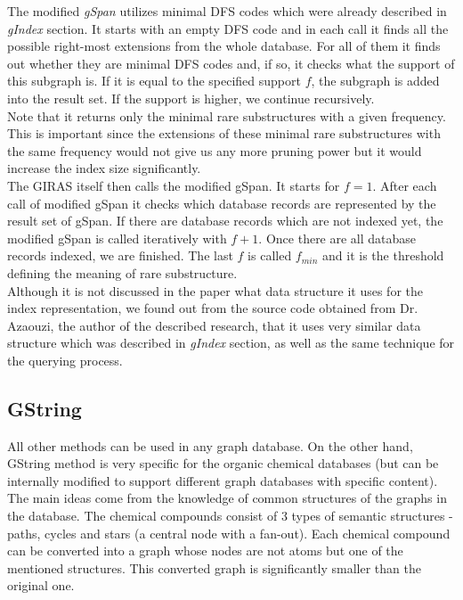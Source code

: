 The modified \textit{gSpan} utilizes minimal DFS codes which were already described in \textit{gIndex} section. It starts with an empty DFS code and in each call it finds all the possible right-most extensions from the whole database. For all of them it finds out whether they are minimal DFS codes and, if so, it checks what the support of this subgraph is. If it is equal to the specified support $f$, the subgraph is added into the result set. If the support is higher, we continue recursively.\\

Note that it returns only the minimal rare substructures with a given frequency. This is important since the extensions of these minimal rare substructures with the same frequency would not give us any more pruning power but it would increase the index size significantly.\\

The GIRAS itself then calls the modified gSpan. It starts for $f=1$. After each call of modified gSpan it checks which database records are represented by the result set of gSpan. If there are database records which are not indexed yet, the modified gSpan is called iteratively with $f+1$. Once there are all database records indexed, we are finished. The last $f$ is called $f_{min}$ and it is the threshold defining the meaning of rare substructure.\\

Although it is not discussed in the paper \cite{GIRAS} what data structure it uses for the index representation, we found out from the source code obtained from Dr. Azaouzi, the author of the described research, that it uses very similar data structure which was described in \textit{gIndex} section, as well as the same technique for the querying process.

\subsection{GString} \label{gstring}

All other methods can be used in any graph database. On the other hand, GString method is very specific for the organic chemical databases (but can be internally modified to support different graph databases with specific content).\\

The main ideas come from the knowledge of common structures of the graphs in the database. The chemical compounds consist of 3 types of semantic structures - paths, cycles and stars (a central node with a fan-out). Each chemical compound can be converted into a graph whose nodes are not atoms but one of the mentioned structures. This converted graph is significantly smaller than the original one.\\


